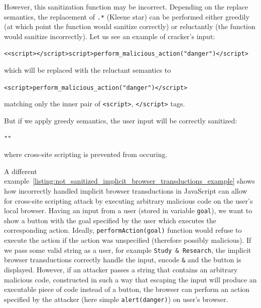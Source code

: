 However, this sanitization function may be incorrect.
Depending on the replace semantics, the replacement of \texttt{.*} (Kleene star) can be performed either greedily (at which point the function would sanitize correctly) or reluctantly (the function would sanitize incorrectly).
Let us see an example of cracker's input:
\begin{center}
 \texttt{<<script></script>script>perform\_malicious\_action("danger")</script>}
\end{center}
which will be replaced with the reluctant semantics to
\begin{center}
 \texttt{<script>perform\_malicious\_action("danger")</script>}
\end{center}

matching only the inner pair of \texttt{<script>}, \texttt{</script>} tags.

But if we apply greedy semantics, the user input will be correctly sanitized:
\begin{center}
 \texttt{""}
\end{center}
where cross-site scripting is prevented from occuring.

A different example~\ref{listing:not_sanitized_implicit_browser_transductions_example} shows how incorrectly handled implicit browser transductions in JavaScript can allow for cross-site scripting attack by executing arbitrary malicious code on the user's local browser.
Having an input from a user (stored in variable \texttt{goal}), we want to show a button with the goal specified by the user which executes the corresponding action. Ideally, \texttt{performAction(goal)} function would refuse to execute the action if the action was unspecified (therefore possibly malicious).
If we pass some valid string as a user, for example \texttt{Study \& Research}, the implicit browser transductions correctly handle the input, encode \texttt{\&} and the button is displayed.
However, if an attacker passes a string that contains an arbitrary malicious code, constructed in such a way that escaping the input will produce an executable piece of code instead of a button, the browser can perform an action specified by the attacker (here simple \texttt{alert(danger)}) on user's browser.

